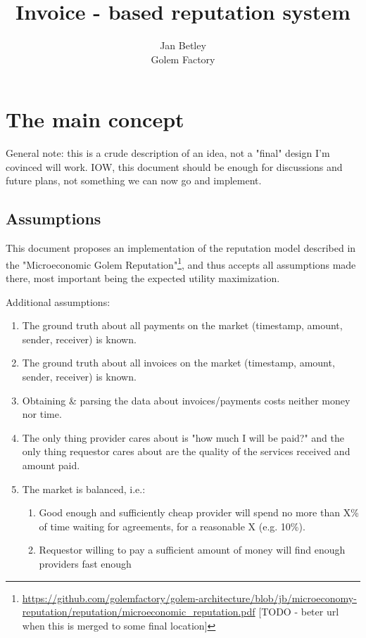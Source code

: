 \documentclass{article}
\title{Invoice - based reputation system}
\author{Jan Betley\\ Golem Factory}
\begin{document}
\maketitle

\section{The main concept}

General note: this is a crude description of an idea, not a "final" design I'm covinced will work.
IOW, this document should be enough for discussions and future plans, not something we can now go and implement.

\subsection{Assumptions}

This document proposes an implementation of the reputation model described in the "Microeconomic Golem Reputation"\footnote{
\href{https://github.com/golemfactory/golem-architecture/blob/jb/microeconomy-reputation/reputation/microeconomic\_reputation.pdf}
     {https://github.com/golemfactory/golem-architecture/blob/jb/microeconomy-reputation/reputation/microeconomic\_reputation.pdf}
[TODO - beter url when this is merged to some final location]}, and thus accepts all assumptions made there, most important being
the expected utility maximization.
    
Additional assumptions:

\begin{enumerate}
    \item The ground truth about all payments on the market (timestamp, amount, sender, receiver) is known.
    \item The ground truth about all invoices on the market (timestamp, amount, sender, receiver) is known.
    \item Obtaining \& parsing the data about invoices/payments costs neither money nor time.
    \item The only thing provider cares about is "how much I will be paid?" and the only thing requestor cares about
        are the quality of the services received and amount paid.
    \item The market is balanced, i.e.: 
        \begin{enumerate}
            \item Good enough and sufficiently cheap provider will spend no more than X\% of time waiting for agreements, for a reasonable X (e.g. 10\%).
            \item Requestor willing to pay a sufficient amount of money will find enough providers fast enough
        \end{enumerate}
\end{enumerate}
\end{document}
